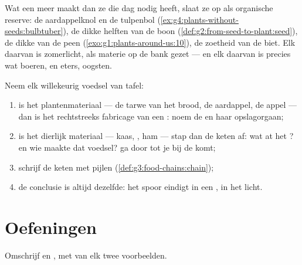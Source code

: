 \begin{example}\label{ex:g6:plants-are-producers:pantry}
Wat een  meer maakt dan ze die dag nodig heeft, slaat ze op als
organische reserve: de aardappelknol en de tulpenbol
(\cref{ex:g4:plants-without-seeds:bulbtuber}), de dikke helften van de
boon (\cref{def:g2:from-seed-to-plant:seed}), de dikke  van de
peen (\cref{exo:g1:plants-around-us:10}), de zoetheid van de biet. Elk
daarvan is zomerlicht, als materie op de bank gezet --- en elk daarvan is
precies wat boeren, en eters, oogsten.
\end{example}

\begin{method}\label{met:g6:plants-are-producers:trace}
Neem elk willekeurig voedsel van tafel:
\begin{enumerate}
  \item is het plantenmateriaal --- de tarwe van het brood, de
        aardappel, de appel --- dan is het rechtstreeks fabricage van
        een : noem de  en haar opslagorgaan;
  \item is het dierlijk materiaal --- kaas, , ham --- stap dan de
        keten af: wat at het ? en wie maakte dat voedsel? ga door
        tot je bij de  komt;
  \item schrijf de keten met pijlen
        (\cref{def:g3:food-chains:chain});
  \item de conclusie is altijd dezelfde: het spoor eindigt in een ,
        in het licht.
\end{enumerate}
\end{method}

\section{Oefeningen}

\begin{exercise}[$\star$]\label{exo:g6:plants-are-producers:1}
Omschrijf  en , met van elk twee
voorbeelden.
\end{exercise}

